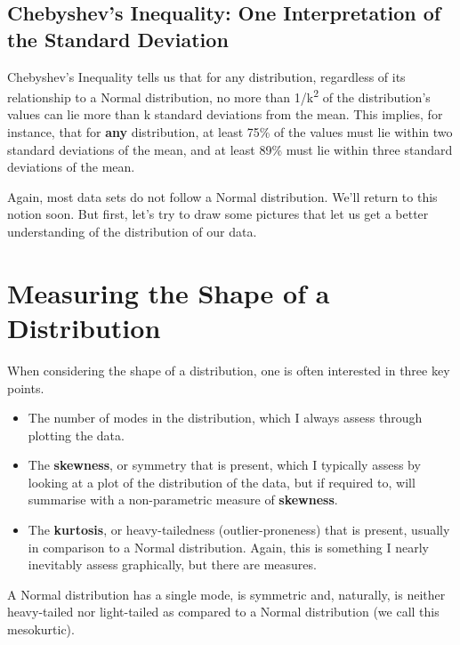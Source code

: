 \documentclass[
]{book}
\providecommand{\tightlist}{%
  \setlength{\itemsep}{0pt}\setlength{\parskip}{0pt}}
\begin{document}
\hypertarget{chebyshevs-inequality-one-interpretation-of-the-standard-deviation}{%
\subsection{Chebyshev's Inequality: One Interpretation of the Standard Deviation}\label{chebyshevs-inequality-one-interpretation-of-the-standard-deviation}}

Chebyshev's Inequality tells us that for any distribution, regardless of its relationship to a Normal distribution, no more than 1/k\textsuperscript{2} of the distribution's values can lie more than k standard deviations from the mean. This implies, for instance, that for \textbf{any} distribution, at least 75\% of the values must lie within two standard deviations of the mean, and at least 89\% must lie within three standard deviations of the mean.

Again, most data sets do not follow a Normal distribution. We'll return to this notion soon. But first, let's try to draw some pictures that let us get a better understanding of the distribution of our data.

\hypertarget{measuring-the-shape-of-a-distribution}{%
\section{Measuring the Shape of a Distribution}\label{measuring-the-shape-of-a-distribution}}

When considering the shape of a distribution, one is often interested in three key points.

\begin{itemize}
\tightlist
\item
  The number of modes in the distribution, which I always assess through plotting the data.
\item
  The \textbf{skewness}, or symmetry that is present, which I typically assess by looking at a plot of the distribution of the data, but if required to, will summarise with a non-parametric measure of \textbf{skewness}.
\item
  The \textbf{kurtosis}, or heavy-tailedness (outlier-proneness) that is present, usually in comparison to a Normal distribution. Again, this is something I nearly inevitably assess graphically, but there are measures.
\end{itemize}

A Normal distribution has a single mode, is symmetric and, naturally, is neither heavy-tailed nor light-tailed as compared to a Normal distribution (we call this mesokurtic).
\end{document}
